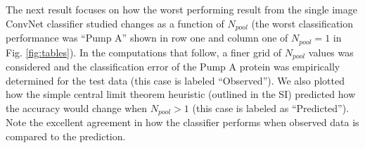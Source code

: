\documentclass[%
reprint,
superscriptaddress,
 aps,
 pre,
]{revtex4-1}
\begin{document}
The next result focuses on how the worst performing result  from the single image ConvNet classifier  studied changes as a function of $N_{pool}$ (the worst classification performance was ``Pump A'' shown in row one and column one of $N_{pool}=1$ in Fig. \ref{fig:tables}).  In the computations that follow, a finer grid of $N_{pool}$ values was considered and the classification error of the Pump A protein was empirically determined for the test data (this case is labeled ``Observed'').  We also plotted how the simple central limit theorem heuristic (outlined in the SI) predicted how the accuracy would change when $N_{pool} > 1$ (this case is labeled as ``Predicted'').  Note the excellent agreement in how the classifier performs when observed data is  compared to the prediction.  %
\end{document}
